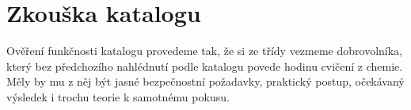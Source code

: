 \section{Zkouška katalogu}
Ověření funkčnosti katalogu provedeme tak, že si ze třídy vezmeme dobrovolníka, který bez předchozího nahlédnutí podle katalogu povede hodinu cvičení z chemie. Měly by mu z něj být jasné bezpečnostní požadavky, praktický postup, očekávaný výsledek i trochu teorie k samotnému pokusu.
